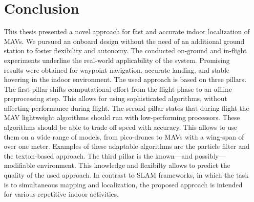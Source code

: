 \chapter{Conclusion}
\label{chap:conclusion}

This thesis presented a novel approach for fast and accurate indoor
localization of MAVs. We pursued an onboard design without the need of
an additional ground station to foster flexibility and autonomy. The
conducted on-ground and in-flight experiments underline the real-world
applicability of the system. Promising results were obtained for
waypoint navigation, accurate landing, and stable hovering in the
indoor environment. The
used approach is based on three pillars.\\
The first pillar shifts computational effort from the flight phase to
an offline preprocessing step. This allows for using sophisticated
algorithms, without affecting performance during flight.
The second pillar states that during flight the MAV lightweight
algorithms should run with low-performing processors. These algorithms
should be able to trade off speed with accuracy. This allows to use
them on a wide range of models, from pico-drones to MAVs with a
wing-span of over one meter. Examples of these adaptable algorithms
are the particle filter
and the texton-based approach.
The third pillar is the known---and possibly---modifiable
environment. This knowledge and flexibilty allows to predict the
quality of the used approach. In contrast to SLAM frameworks, in which
the task is to simultaneous mapping and localization, the proposed
approach is intended for various repetitive indoor activities.
